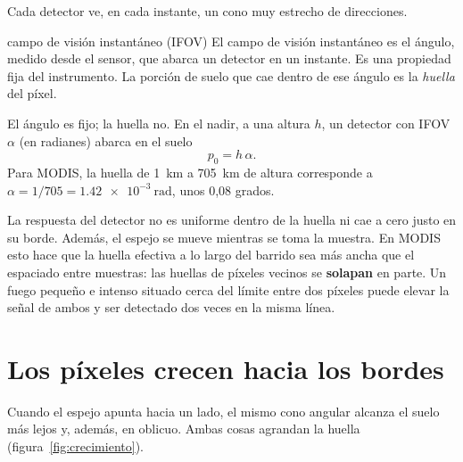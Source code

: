 Cada detector ve, en cada instante, un cono muy estrecho de direcciones.

\begin{definicion}{campo de visión instantáneo (IFOV)}
El campo de visión instantáneo es el ángulo, medido desde el sensor, que abarca un detector en
un instante. Es una propiedad fija del instrumento. La porción de suelo que cae dentro de ese
ángulo es la \emph{huella} del píxel.
\end{definicion}

El ángulo es fijo; la huella no. En el nadir, a una altura $h$, un detector con IFOV $\alpha$
(en radianes) abarca en el suelo
\begin{equation}
  p_0 = h\,\alpha .
\end{equation}
Para MODIS, la huella de 1~km a 705~km de altura corresponde a
$\alpha = 1/705 = \SI{1.42e-3}{\radian}$, unos 0,08 grados.

\begin{atencion}
La respuesta del detector no es uniforme dentro de la huella ni cae a cero justo en su borde.
Además, el espejo se mueve mientras se toma la muestra. En MODIS esto hace que la huella efectiva
a lo largo del barrido sea más ancha que el espaciado entre muestras: las huellas de píxeles
vecinos se \textbf{solapan} en parte. Un fuego pequeño e intenso situado cerca del límite entre
dos píxeles puede elevar la señal de ambos y ser detectado dos veces en la misma línea.
\end{atencion}

\section{Los píxeles crecen hacia los bordes}

Cuando el espejo apunta hacia un lado, el mismo cono angular alcanza el suelo más lejos y,
además, en oblicuo. Ambas cosas agrandan la huella (figura~\ref{fig:crecimiento}).


